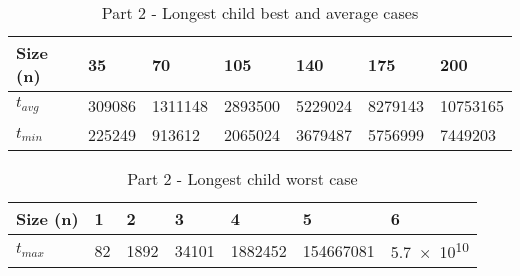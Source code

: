 \usepackage{array}
\usepackage{tabu}
\usepackage{siunitx}
\usepackage{booktabs}%

\begin{table}[h!]
\fontsize{7.5}{11}\selectfont
\begin{center}
\begin{tabu} to 0.5\textwidth {|X[c]|X[c]|X[c]|X[c]|X[c]|X[c]|X[c]|}
 \hline
 Size (n) & 35 & 70 & 105 & 140 & 175 & 200 \\
 \hline\hline
 $t_{avg}$ & 309086 & 1311148 & 2893500 & 5229024 & 8279143 & 10753165 \\
 \hline
 $t_{min}$ & 225249 & 913612 & 2065024 & 3679487 & 5756999 & 7449203 \\
 \hline
\end{tabu}
\label{path_table}
\caption{Part 2 - Longest child best and average cases}
\end{center}
\end{table}

\begin{table}[h!]
\fontsize{7.5}{11}\selectfont
\begin{center}
\begin{tabu} to 0.5
 \hline
 Size (n) & 1 & 2 & 3 & 4 & 5 & 6 \\
 \hline\hline
 $t_{max}$ & 82 & 1892 & 34101 & 1882452 & 154667081 & \num{5.7e10} \\
 \hline
\end{tabu}
\label{path_table_worst}
\caption{Part 2 - Longest child worst case}
\end{center}
\end{table}
